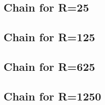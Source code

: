 \subsection{} %
\label{sec:filter_frequency_responses:cfir25}

\subsection{} %
\label{sec:filter_frequency_responses:cic125}

\subsection{} %
\label{sec:filter_frequency_responses:cfir125}

\subsection{Chain for R=25} %
\label{sec:filter_frequency_responses:chain25}

\subsection{Chain for R=125} %
\label{sec:filter_frequency_responses:chain125}

\subsection{Chain for R=625} %
\label{sec:filter_frequency_responses:chain625}

\subsection{Chain for R=1250} %
\label{sec:filter_frequency_responses:chain1250}

